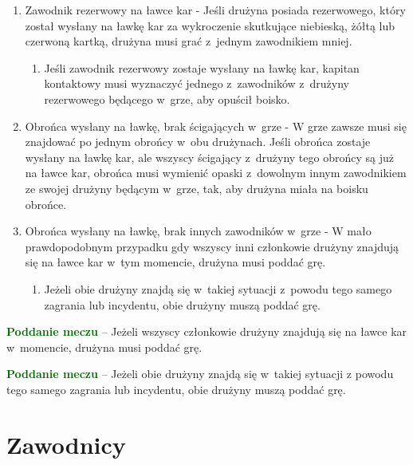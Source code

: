 \documentclass[12pt,a4paper]{article}
\renewcommand{\paragraph}[1]{
  \oldparagraph{#1}%
  \leftskip2cm
}
\newcommand\other[1]{\bgroup\textcolor{darkgreen}{\textbf{#1}}}
\begin{document}
\paragraph{Nietypowe sytuacje na ławce kar}

\begin{enumerate}
	\item
	      Zawodnik rezerwowy na ławce kar - Jeśli drużyna posiada rezerwowego,
	      który został wysłany na ławkę kar za wykroczenie skutkujące niebieską,
	      żółtą lub czerwoną kartką, drużyna musi grać z~jednym zawodnikiem
	      mniej.

	      \begin{enumerate}
		      \item
		            Jeśli zawodnik rezerwowy zostaje wysłany na ławkę kar, kapitan
		            kontaktowy musi wyznaczyć jednego z~zawodników z~drużyny rezerwowego
		            będącego w~grze, aby opuścił boisko.
	      \end{enumerate}
	\item
	      Obrońca wysłany na ławkę, brak ścigających w~grze - W grze zawsze musi
	      się znajdować po jednym obrońcy w~obu drużynach. Jeśli obrońca zostaje
	      wysłany na ławkę kar, ale wszyscy ścigający z~drużyny tego obrońcy są
	      już na ławce kar, obrońca musi wymienić opaski z~dowolnym innym
	      zawodnikiem ze swojej drużyny będącym w~grze, tak, aby drużyna miała
	      na boisku obrońce.
	\item
	      Obrońca wysłany na ławkę, brak innych zawodników w~grze - W mało
	      prawdopodobnym przypadku gdy wszyscy inni członkowie drużyny znajdują
	      się na ławce kar w~tym momencie, drużyna musi poddać grę.

	      \begin{enumerate}
		      \item
		            Jeżeli obie drużyny znajdą się w~takiej sytuacji z~powodu tego
		            samego zagrania lub incydentu, obie drużyny muszą poddać grę.
	      \end{enumerate}
\end{enumerate}

\other{Poddanie meczu} -- Jeżeli wszyscy członkowie drużyny znajdują się
na ławce kar w~momencie, drużyna musi poddać grę.

\other{Poddanie meczu} -- Jeżeli obie drużyny znajdą się w~takiej sytuacji
z powodu tego samego zagrania lub incydentu, obie drużyny muszą poddać
grę.


\pagebreak
\section{Zawodnicy}
\end{document}
